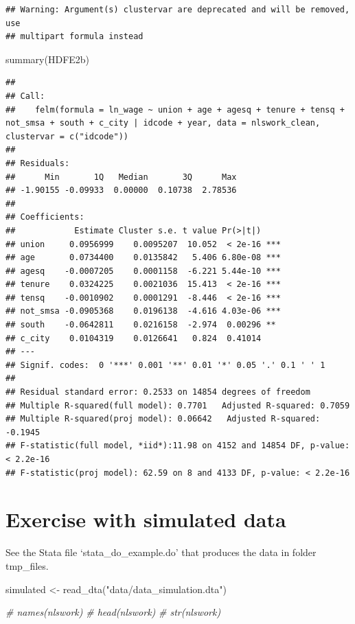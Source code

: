 \documentclass[
]{article}
\newenvironment{Shaded}{\begin{snugshade}}{\end{snugshade}}
\newcommand{\CommentTok}[1]{\textcolor[rgb]{0.56,0.35,0.01}{\textit{#1}}}
\newcommand{\FunctionTok}[1]{\textcolor[rgb]{0.00,0.00,0.00}{#1}}
\newcommand{\NormalTok}[1]{#1}
\newcommand{\OtherTok}[1]{\textcolor[rgb]{0.56,0.35,0.01}{#1}}
\newcommand{\StringTok}[1]{\textcolor[rgb]{0.31,0.60,0.02}{#1}}
\begin{document}
\begin{verbatim}
## Warning: Argument(s) clustervar are deprecated and will be removed, use
## multipart formula instead
\end{verbatim}

\begin{Shaded}
\begin{Highlighting}[]
      \FunctionTok{summary}\NormalTok{(HDFE2b)}
\end{Highlighting}
\end{Shaded}

\begin{verbatim}
## 
## Call:
##    felm(formula = ln_wage ~ union + age + agesq + tenure + tensq +      not_smsa + south + c_city | idcode + year, data = nlswork_clean,      clustervar = c("idcode")) 
## 
## Residuals:
##      Min       1Q   Median       3Q      Max 
## -1.90155 -0.09933  0.00000  0.10738  2.78536 
## 
## Coefficients:
##            Estimate Cluster s.e. t value Pr(>|t|)    
## union     0.0956999    0.0095207  10.052  < 2e-16 ***
## age       0.0734400    0.0135842   5.406 6.80e-08 ***
## agesq    -0.0007205    0.0001158  -6.221 5.44e-10 ***
## tenure    0.0324225    0.0021036  15.413  < 2e-16 ***
## tensq    -0.0010902    0.0001291  -8.446  < 2e-16 ***
## not_smsa -0.0905368    0.0196138  -4.616 4.03e-06 ***
## south    -0.0642811    0.0216158  -2.974  0.00296 ** 
## c_city    0.0104319    0.0126641   0.824  0.41014    
## ---
## Signif. codes:  0 '***' 0.001 '**' 0.01 '*' 0.05 '.' 0.1 ' ' 1
## 
## Residual standard error: 0.2533 on 14854 degrees of freedom
## Multiple R-squared(full model): 0.7701   Adjusted R-squared: 0.7059 
## Multiple R-squared(proj model): 0.06642   Adjusted R-squared: -0.1945 
## F-statistic(full model, *iid*):11.98 on 4152 and 14854 DF, p-value: < 2.2e-16 
## F-statistic(proj model): 62.59 on 8 and 4133 DF, p-value: < 2.2e-16
\end{verbatim}

\hypertarget{exercise-with-simulated-data}{%
\section{Exercise with simulated
data}\label{exercise-with-simulated-data}}

See the Stata file `stata\_do\_example.do' that produces the data in
folder tmp\_files.

\begin{Shaded}
\begin{Highlighting}[]
\NormalTok{simulated }\OtherTok{\textless{}{-}} \FunctionTok{read\_dta}\NormalTok{(}\StringTok{"data/data\_simulation.dta"}\NormalTok{)}

\CommentTok{\# names(nlswork)}
\CommentTok{\# head(nlswork)}
\CommentTok{\# str(nlswork)}
\end{Highlighting}
\end{Shaded}
\end{document}
